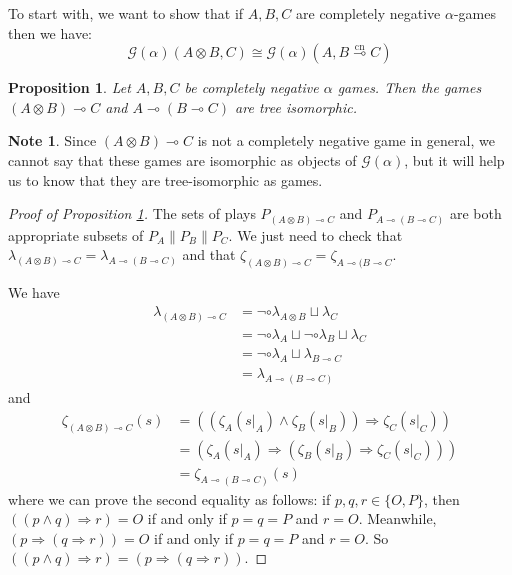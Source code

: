 \documentclass[11pt]{article} %
\theoremstyle{plain} %
\newtheorem{proposition}[theorem]{Proposition}
\theoremstyle{definition} %
\theoremstyle{note}
\newtheorem{note}[theorem]{Note}
\theoremstyle{exercisestyle}
\newcommand{\tensor}{\otimes}
\renewcommand{\implies}{\multimap}
\newcommand{\cprd}{\sqcup}
\newcommand{\G}{\mathcal G}
\newcommand{\OP}{\{O,P\}}
\DeclareMathOperator{\cn}{cn}
\newcommand{\impliescn}{\overset{\cn}{\implies}}
\begin{document}
To start with, we want to show that if $A,B,C$ are completely negative $\alpha$-games then we have:
\[
  \G(\alpha)(A\tensor B, C)\cong\G(\alpha)(A, B\impliescn C)
  \]

\begin{proposition}
  \label{impliesTreeIsom}
  Let $A,B,C$ be completely negative $\alpha$ games.  Then the games $(A\tensor B)\implies C$ and $A\implies(B\implies C)$ are tree isomorphic.
\end{proposition}

\begin{note}
  Since $(A\tensor B)\implies C$ is not a completely negative game in general, we cannot say that these games are isomorphic as objects of $\G(\alpha)$, but it will help us to know that they are tree-isomorphic as games.
\end{note}

\begin{proof}[Proof of Proposition \ref{impliesTreeIsom}]
  The sets of plays $P_{(A\tensor B)\implies C}$ and $P_{A\implies(B\implies C)}$ are both appropriate subsets of $P_A\|P_B\|P_C$.  We just need to check that $\lambda_{(A\tensor B)\implies C}=\lambda_{A\implies(B\implies C)}$ and that $\zeta_{(A\tensor B)\implies C}=\zeta_{A\implies(B\implies C}$.  

  We have
  \begin{align*}
    \lambda_{(A\tensor B)\implies C} &= \neg\circ\lambda_{A\tensor B}\cprd\lambda_C\\
    &= \neg\circ\lambda_A\cprd\neg\circ\lambda_B\cprd\lambda_C\\
    &= \neg\circ\lambda_A\cprd\lambda_{B\implies C}\\
    &= \lambda_{A\implies(B\implies C)}
  \end{align*}
  and
  \begin{align*}
    \zeta_{(A\tensor B)\implies C}(s) & = ((\zeta_A(s\vert_A)\wedge\zeta_B(s\vert_B))\Rightarrow\zeta_C(s\vert_C))\\
    &=(\zeta_A(s\vert_A)\Rightarrow(\zeta_B(s\vert_B)\Rightarrow\zeta_C(s\vert_C))) \\
    &=\zeta_{A\implies(B\implies C)}(s)
  \end{align*}
  where we can prove the second equality as follows: if $p,q,r\in\OP$, then $((p\wedge q)\Rightarrow r) = O$ if and only if $p=q=P$ and $r=O$.  Meanwhile, $(p\Rightarrow (q\Rightarrow r))=O$ if and only if $p=q=P$ and $r=O$.  So $((p\wedge q)\Rightarrow r) = (p\Rightarrow(q\Rightarrow r))$.
\end{proof}



\end{document}

